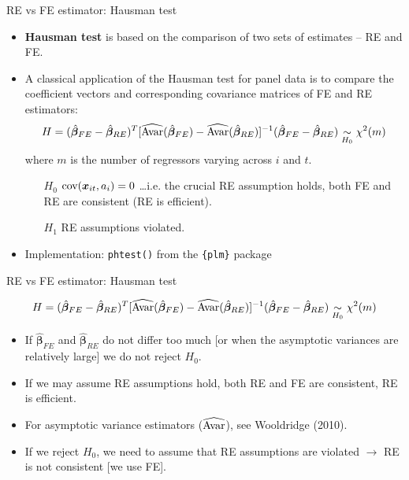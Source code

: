 \documentclass[usenames,dvipsnames]{beamer}
\begin{document}
\begin{frame}{RE vs FE estimator: Hausman test}
\small
\begin{itemize}

    \item \textbf{Hausman test} is based on the comparison of two sets of estimates -- RE and FE.
    \bigskip
    \item A classical application of the Hausman test for panel data is to compare the coefficient vectors and corresponding covariance matrices of FE and RE estimators:
    $$H=(\hat{\bm{\beta}}_{FE} - \hat{\bm{\beta}}_{RE})^T [\widehat{\textnormal{Avar}}(\hat{\bm{\beta}}_{FE}) - \widehat{\textnormal{Avar}}(\hat{\bm{\beta}}_{RE})]^{-1} (\hat{\bm{\beta}}_{FE} - \hat{\bm{\beta}}_{RE}) \underset{H_0}{\sim} \chi^2(m)$$
    where $m$ is the number of regressors varying across $i$ and $t$.
    \smallskip
    \begin{itemize}
    \item[$H_0$] $\textnormal{cov}(\bm{x}_{it},a_i) = 0$ \dots i.e. the crucial RE assumption holds, both FE and RE are consistent (RE is efficient). \\ \smallskip
    \item[$H_1$] RE assumptions violated.
    \end{itemize}
    \medskip
    \item Implementation: \texttt{phtest()} from the \texttt{\{plm\}} package

\end{itemize}
\end{frame}
\begin{frame}{RE vs FE estimator: Hausman test}

\small $$H=(\hat{\bm{\beta}}_{FE} - \hat{\bm{\beta}}_{RE})^T [\widehat{\textnormal{Avar}}(\hat{\bm{\beta}}_{FE}) - \widehat{\textnormal{Avar}}(\hat{\bm{\beta}}_{RE})]^{-1} (\hat{\bm{\beta}}_{FE} - \hat{\bm{\beta}}_{RE}) \underset{H_0}{\sim} \chi^2(m)$$
\begin{itemize}
    \item If $\hat{\bm{\beta}}_{FE}$ and $\hat{\bm{\beta}}_{RE}$ do not differ too much [or when the asymptotic variances are relatively large] we do not reject $H_0$. 
    \medskip
    \item If we may assume RE assumptions hold, both RE and FE are consistent, RE is efficient. 
    \medskip
    \item For asymptotic variance estimators ($\widehat{\textnormal{Avar}}$), see Wooldridge (2010). 
    \medskip
    \item If we reject $H_0$, we need to assume that RE assumptions are violated $\rightarrow$ RE is not consistent [we use FE].
\end{itemize}
\end{frame}
\end{document}
